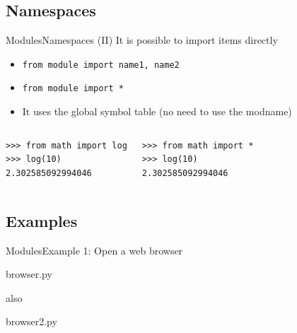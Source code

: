 \documentclass[10pt,compress]{beamer} %
\begin{document}
\subsection{Namespaces}
\begin{frame}[fragile]{Modules}{Namespaces (II)}
 	It is possible to import items directly
		\begin{itemize}
		\item \texttt{from module import name1, name2}
		\item \texttt{from module import *}
		\item It uses the global symbol table (no need to use the modname)
			\end{itemize}
	
	\begin{columns}
	\begin{exampleblock}{}
	\begin{verbatim}
>>> from math import log
>>> log(10)
2.302585092994046
\end{verbatim}
	\end{exampleblock}

	\begin{exampleblock}{}
	\begin{verbatim}
>>> from math import *
>>> log(10)
2.302585092994046
\end{verbatim}
	\end{exampleblock}
 
    \end{columns}
\end{frame}

\subsection{Examples}

\begin{frame}{Modules}{Example 1: Open a web browser}
	\vspace{-0.2cm}
	\begin{exampleblock}{browser.py}
	\vspace{-0.2cm}
	
	\vspace{-0.2cm}
	\end{exampleblock}

    also 

	\begin{exampleblock}{browser2.py}
	\vspace{-0.2cm}
	
	\vspace{-0.2cm}
	\end{exampleblock}

\end{frame}
\end{document}
